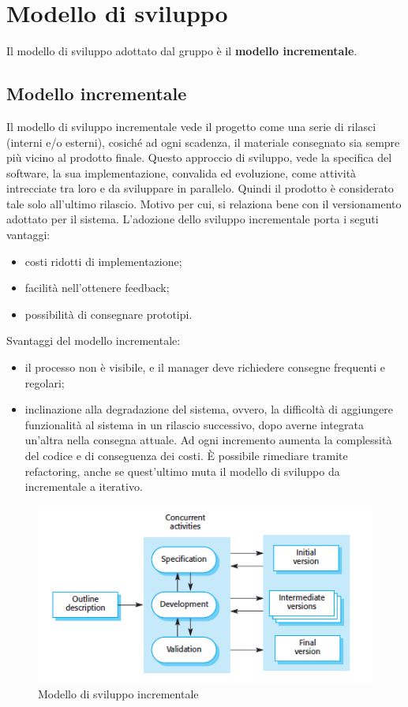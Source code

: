 \section{Modello di sviluppo}
Il modello di sviluppo adottato dal gruppo è il \textbf{modello incrementale}.
\subsection{Modello incrementale}
Il modello di sviluppo incrementale vede il progetto come una serie di rilasci (interni e/o esterni), cosiché ad ogni scadenza, il materiale consegnato sia sempre più vicino al prodotto finale.
Questo approccio di sviluppo, vede la specifica del software, la sua implementazione, convalida ed evoluzione, come attività intrecciate tra loro e da sviluppare in parallelo. Quindi il prodotto è considerato tale solo all'ultimo rilascio. Motivo per cui, si relaziona bene con il versionamento adottato per il sistema.
L'adozione dello sviluppo incrementale porta i seguti vantaggi:
\begin{itemize}
\item costi ridotti di implementazione;
\item facilità nell'ottenere feedback;
\item possibilità di consegnare prototipi.
\end{itemize}
Svantaggi del modello incrementale:
\begin{itemize}
\item il processo non è visibile, e il manager deve richiedere consegne frequenti e regolari;
\item inclinazione alla degradazione del sistema, ovvero, la difficoltà di aggiungere funzionalità al sistema in un rilascio successivo, dopo averne integrata un'altra nella consegna attuale. Ad ogni incremento aumenta la complessità del codice e di conseguenza dei costi. È possibile rimediare tramite refactoring, anche se quest'ultimo muta il modello di sviluppo da incrementale a iterativo.
\end{itemize}
\begin{figure}[H]
	\centering
	\includegraphics[width=0.70\linewidth]{img/incremental_development.png}
	\caption{Modello di sviluppo incrementale}
\end{figure}

